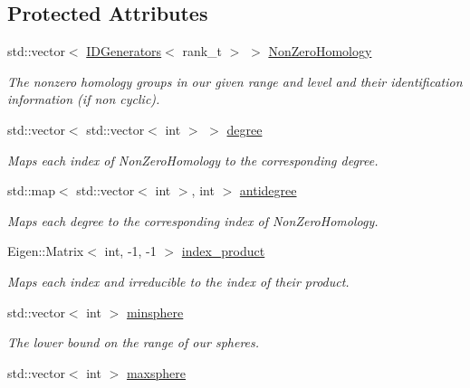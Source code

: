 \subsection*{Protected Attributes}
\begin{DoxyCompactItemize}
\item 
std\+::vector$<$ \hyperlink{classMackey_1_1IDGenerators}{I\+D\+Generators}$<$ rank\+\_\+t $>$ $>$ \hyperlink{classMackey_1_1MultiplicationTable_ad392b9570c511595a08642f5d54d20eb}{Non\+Zero\+Homology}
\begin{DoxyCompactList}\small\item\em The nonzero homology groups in our given range and level and their identification information (if non cyclic). \end{DoxyCompactList}\item 
std\+::vector$<$ std\+::vector$<$ int $>$ $>$ \hyperlink{classMackey_1_1MultiplicationTable_a9a0d2a2d8561e378e08fcf4929df2cf6}{degree}
\begin{DoxyCompactList}\small\item\em Maps each index of Non\+Zero\+Homology to the corresponding degree. \end{DoxyCompactList}\item 
std\+::map$<$ std\+::vector$<$ int $>$, int $>$ \hyperlink{classMackey_1_1MultiplicationTable_ac5749155e5531a3c728d8227caed63eb}{antidegree}
\begin{DoxyCompactList}\small\item\em Maps each degree to the corresponding index of Non\+Zero\+Homology. \end{DoxyCompactList}\item 
Eigen\+::\+Matrix$<$ int, -\/1, -\/1 $>$ \hyperlink{classMackey_1_1MultiplicationTable_a83a89961f82ad9fd2b1ae41b912ef434}{index\+\_\+product}
\begin{DoxyCompactList}\small\item\em Maps each index and irreducible to the index of their product. \end{DoxyCompactList}\item 
std\+::vector$<$ int $>$ \hyperlink{classMackey_1_1MultiplicationTable_a071f7d7c6cd1c75836b64ea8e9923b49}{minsphere}
\begin{DoxyCompactList}\small\item\em The lower bound on the range of our spheres. \end{DoxyCompactList}\item 
std\+::vector$<$ int $>$ \hyperlink{classMackey_1_1MultiplicationTable_a4355003c6be4a4f857eba151c8e5bcf6}{maxsphere}

\end{DoxyCompactItemize}
